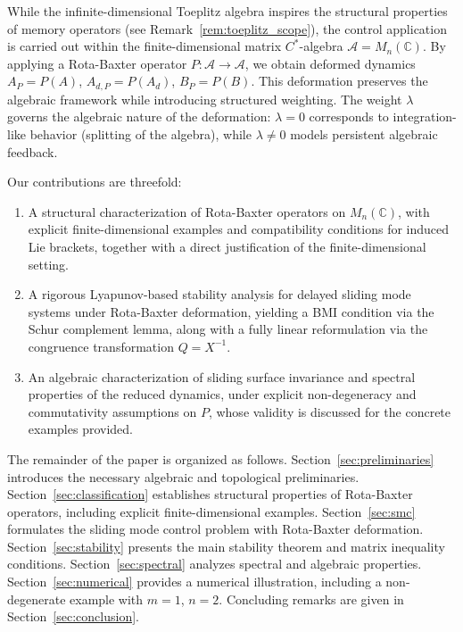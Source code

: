\documentclass[10pt]{amsart}
\newcommand{\Ac}{\mathcal{A}}
\numberwithin{equation}{section}
\begin{document}
While the infinite-dimensional Toeplitz algebra inspires the structural properties of
memory operators (see Remark~\ref{rem:toeplitz_scope}), the control application is
carried out within the finite-dimensional matrix $C^*$-algebra \(\Ac = M_n(\mathbb{C})\).
By applying a Rota-Baxter operator \(P:\Ac\to\Ac\), we obtain deformed dynamics
\(A_P=P(A)\), \(A_{d,P}=P(A_d)\), \(B_P=P(B)\). This deformation preserves the
algebraic framework while introducing structured weighting. The weight \(\lambda\) governs
the algebraic nature of the deformation: \(\lambda=0\) corresponds to integration-like
behavior (splitting of the algebra), while \(\lambda\neq 0\) models persistent algebraic
feedback.

Our contributions are threefold:
\begin{enumerate}
  \item A structural characterization of Rota-Baxter operators on \(M_n(\mathbb{C})\),
        with explicit finite-dimensional examples and compatibility conditions for induced
        Lie brackets, together with a direct justification of the finite-dimensional setting.
  \item A rigorous Lyapunov-based stability analysis for delayed sliding mode systems under
        Rota-Baxter deformation, yielding a BMI condition via the Schur complement lemma,
        along with a fully linear reformulation via the congruence transformation $Q = X^{-1}$.
  \item An algebraic characterization of sliding surface invariance and spectral properties
        of the reduced dynamics, under explicit non-degeneracy and commutativity assumptions
        on \(P\), whose validity is discussed for the concrete examples provided.
\end{enumerate}

The remainder of the paper is organized as follows. Section~\ref{sec:preliminaries}
introduces the necessary algebraic and topological preliminaries.
Section~\ref{sec:classification} establishes structural properties of Rota-Baxter
operators, including explicit finite-dimensional examples. Section~\ref{sec:smc}
formulates the sliding mode control problem with Rota-Baxter deformation.
Section~\ref{sec:stability} presents the main stability theorem and matrix inequality
conditions. Section~\ref{sec:spectral} analyzes spectral and algebraic properties.
Section~\ref{sec:numerical} provides a numerical illustration, including a non-degenerate
example with $m=1$, $n=2$. Concluding remarks are given in Section~\ref{sec:conclusion}.
\end{document}
